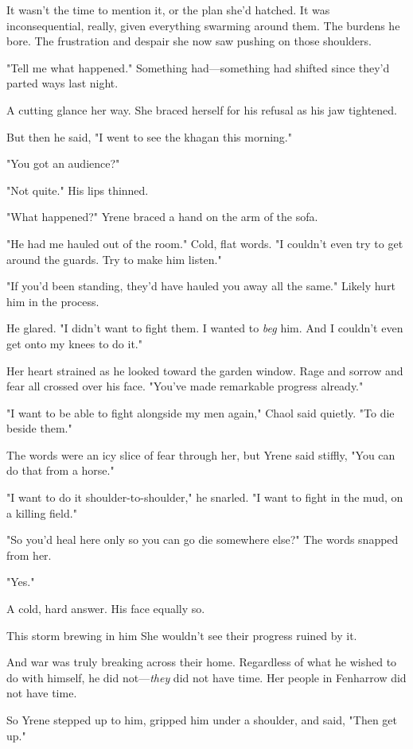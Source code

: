 It wasn't the time to mention it, or the plan she'd hatched. It was inconsequential, really, given everything swarming around them. The burdens he bore. The frustration and despair she now saw pushing on those shoulders.

"Tell me what happened." Something had---something had shifted since they'd parted ways last night.

A cutting glance her way. She braced herself for his refusal as his jaw tightened.

But then he said, "I went to see the khagan this morning."

"You got an audience?"

"Not quite." His lips thinned.

"What happened?" Yrene braced a hand on the arm of the sofa.

"He had me hauled out of the room." Cold, flat words. "I couldn't even try to get around the guards. Try to make him listen."

"If you'd been standing, they'd have hauled you away all the same." Likely hurt him in the process.

He glared. "I didn't want to fight them. I wanted to \emph{beg} him. And I couldn't even get onto my knees to do it."

Her heart strained as he looked toward the garden window. Rage and sorrow and fear all crossed over his face. "You've made remarkable progress already."

"I want to be able to fight alongside my men again," Chaol said quietly. "To die beside them."

The words were an icy slice of fear through her, but Yrene said stiffly, "You can do that from a horse."

"I want to do it shoulder-to-shoulder," he snarled. "I want to fight in the mud, on a killing field."

"So you'd heal here only so you can go die somewhere else?" The words snapped from her.

"Yes."

A cold, hard answer. His face equally so.

This storm brewing in him  She wouldn't see their progress ruined by it.

And war was truly breaking across their home. Regardless of what he wished to do with himself, he did not---\emph{they} did not have time. Her people in Fenharrow did not have time.

So Yrene stepped up to him, gripped him under a shoulder, and said, "Then get up."

